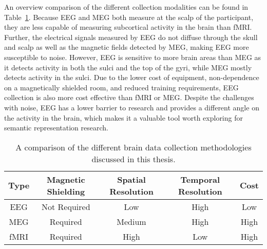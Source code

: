 An overview comparison of the different collection modalities can be found in 
Table~\ref{table:modalities}. Because EEG and MEG both measure at the scalp of 
the participant, they are less capable of measuring subcortical activity in the 
brain than fMRI. Further, the electrical signals measured by EEG do not diffuse 
through the skull and scalp as well as the magnetic fields detected by MEG, 
making EEG more susceptible to noise. However, EEG is sensitive to more brain 
areas than MEG as it detects activity in both the sulci and the top of the 
gyri, while MEG mostly detects activity in the sulci. Due to the lower cost of 
equipment, non-dependence on a magnetically shielded room, and reduced training 
requirements, EEG collection is also more cost effective than fMRI or MEG.  
Despite the challenges with noise, EEG has a lower barrier to research and 
provides a different angle on the activity in the brain, which makes it a 
valuable tool worth exploring for semantic representation research. 

\begin{table}[t]
  \begin{center}
    \def\arraystretch{1.5}
    \begin{tabular}{ |c|c|c|c|c| }
      \hline
      Type & Magnetic Shielding & Spatial Resolution & Temporal 
      Resolution & Cost \\
      \hline
      EEG & Not Required & Low & High & Low \\
      MEG & Required & Medium & High & High \\
      fMRI & Required & High & Low & High \\
      \hline
    \end{tabular}
  \end{center}
  \caption[Collection Methodologies Comparison]{
    A comparison of the different brain data collection methodologies discussed 
    in this thesis.
  }
  \label{table:modalities}
\end{table}
